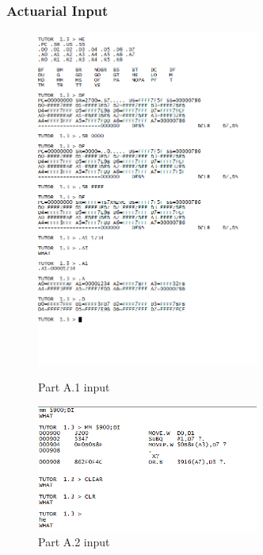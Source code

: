 \documentclass{article}
\begin{document}
			\subsubsection{Actuarial Input}
					\begin{figure}[!htb]
					\begin{center}
					\includegraphics[width=0.65\textwidth]{PARTa} 
					\caption{Part A.1 input}
					\includegraphics[width=0.65\textwidth]{PARTa1} 
					\caption{Part A.2 input}
					
					\end{center}
			\end{figure}
\end{document}
